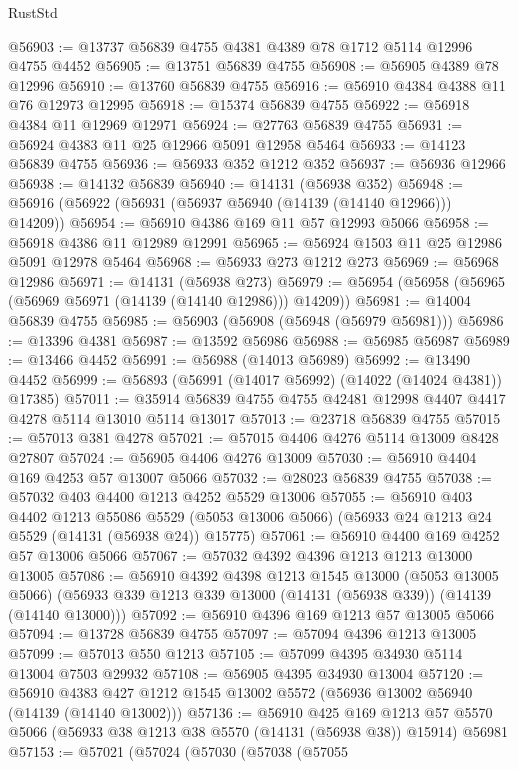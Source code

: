 \begin{lexlean}{RustStd}
\begin{coremodule}
@56903 := @13737 @56839 @4755 @4381 @4389 @78 @1712 @5114 @12996 @4755 @4452
@56905 := @13751 @56839 @4755
@56908 := @56905 @4389 @78 @12996
@56910 := @13760 @56839 @4755
@56916 := @56910 @4384 @4388 @11 @76 @12973 @12995
@56918 := @15374 @56839 @4755
@56922 := @56918 @4384 @11 @12969 @12971
@56924 := @27763 @56839 @4755
@56931 := @56924 @4383 @11 @25 @12966 @5091 @12958 @5464
@56933 := @14123 @56839 @4755
@56936 := @56933 @352 @1212 @352
@56937 := @56936 @12966
@56938 := @14132 @56839
@56940 := @14131 (@56938 @352)
@56948 := @56916 (@56922 (@56931 (@56937 @56940 (@14139 (@14140 @12966))) @14209))
@56954 := @56910 @4386 @169 @11 @57 @12993 @5066
@56958 := @56918 @4386 @11 @12989 @12991
@56965 := @56924 @1503 @11 @25 @12986 @5091 @12978 @5464
@56968 := @56933 @273 @1212 @273
@56969 := @56968 @12986
@56971 := @14131 (@56938 @273)
@56979 := @56954 (@56958 (@56965 (@56969 @56971 (@14139 (@14140 @12986))) @14209))
@56981 := @14004 @56839 @4755
@56985 := @56903 (@56908 (@56948 (@56979 @56981)))
@56986 := @13396 @4381
@56987 := @13592 @56986
@56988 := @56985 @56987
@56989 := @13466 @4452
@56991 := @56988 (@14013 @56989)
@56992 := @13490 @4452
@56999 := @56893 (@56991 (@14017 @56992) (@14022 (@14024 @4381)) @17385)
@57011 := @35914 @56839 @4755 @4755 @42481 @12998 @4407 @4417 @4278 @5114 @13010 @5114 @13017
@57013 := @23718 @56839 @4755
@57015 := @57013 @381 @4278
@57021 := @57015 @4406 @4276 @5114 @13009 @8428 @27807
@57024 := @56905 @4406 @4276 @13009
@57030 := @56910 @4404 @169 @4253 @57 @13007 @5066
@57032 := @28023 @56839 @4755
@57038 := @57032 @403 @4400 @1213 @4252 @5529 @13006
@57055 := @56910
    @403
    @4402
    @1213
    @55086
    @5529
    (@5053 @13006 @5066)
    (@56933 @24 @1213 @24 @5529 (@14131 (@56938 @24)) @15775)
@57061 := @56910 @4400 @169 @4252 @57 @13006 @5066
@57067 := @57032 @4392 @4396 @1213 @1213 @13000 @13005
@57086 := @56910
    @4392
    @4398
    @1213
    @1545
    @13000
    (@5053 @13005 @5066)
    (@56933 @339 @1213 @339 @13000 (@14131 (@56938 @339)) (@14139 (@14140 @13000)))
@57092 := @56910 @4396 @169 @1213 @57 @13005 @5066
@57094 := @13728 @56839 @4755
@57097 := @57094 @4396 @1213 @13005
@57099 := @57013 @550 @1213
@57105 := @57099 @4395 @34930 @5114 @13004 @7503 @29932
@57108 := @56905 @4395 @34930 @13004
@57120 := @56910 @4383 @427 @1212 @1545 @13002 @5572 (@56936 @13002 @56940 (@14139 (@14140 @13002)))
@57136 := @56910
    @425
    @169
    @1213
    @57
    @5570
    @5066
    (@56933 @38 @1213 @38 @5570 (@14131 (@56938 @38)) @15914)
    @56981
@57153 := @57021
    (@57024
      (@57030
        (@57038
          (@57055

\end{coremodule}
\end{lexlean}
